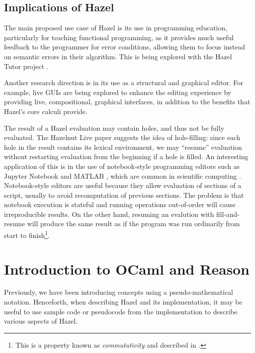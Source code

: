 \subsection{Implications of Hazel}
\label{sec:hazel-implications}

The main proposed use case of Hazel is its use in programming education, particularly for teaching functional programming, as it provides much useful feedback to the programmer for error conditions, allowing them to focus instead on semantic errors in their algorithm. This is being explored with the Hazel Tutor project \cite{potter2020hazel}.

Another research direction is in its use as a structural and graphical editor. For example, live GUIs \cite{omar2021filling} are being explored to enhance the editing experience by providing live, compositional, graphical interfaces, in addition to the benefits that Hazel's core calculi provide.

The result of a Hazel evaluation may contain holes, and thus not be fully evaluated. The Hazelnut Live paper \cite{conf/popl/HazelnutLive19} suggests the idea of hole-filling: since each hole in the result contains its lexical environment, we may ``resume'' evaluation without restarting evaluation from the beginning if a hole is filled. An interesting application of this is in the use of notebook-style programming editors such as Jupyter Notebook  and MATLAB , which are common in scientific computing . Notebook-style editors are useful because they allow evaluation of sections of a script, usually to avoid recomputation of previous sections. The problem is that notebook execution is stateful and running operations out-of-order will cause irreproducible results. On the other hand, resuming an evalution with fill-and-resume will produce the same result as if the program was run ordinarily from start to finish\footnote{This is a property known as \textit{commutativity} and described in \cite{conf/popl/HazelnutLive19}.}.

\section{Introduction to OCaml and Reason}
\label{sec:ocaml-intro}

Previously, we have been introducing concepts using a pseudo-mathematical notation. Henceforth, when describing Hazel and its implementation, it may be useful to use sample code or pseudocode from the implementation to describe various aspects of Hazel.

